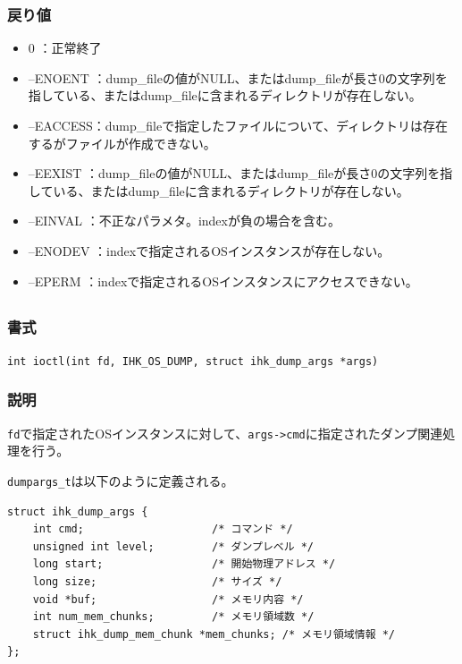 \documentclass[twoside,11pt,fleqn]{book}
\begin{document}
\subsubsection*{戻り値}{\quad}
\begin{itemize}
\item       0 ：正常終了
\item --ENOENT ：dump\_fileの値がNULL、またはdump\_fileが長さ0の文字列を指している、またはdump\_fileに含まれるディレクトリが存在しない。
\item --EACCESS：dump\_fileで指定したファイルについて、ディレクトリは存在するがファイルが作成できない。
\item --EEXIST ：dump\_fileの値がNULL、またはdump\_fileが長さ0の文字列を指している、またはdump\_fileに含まれるディレクトリが存在しない。
\item --EINVAL ：不正なパラメタ。indexが負の場合を含む。
\item --ENODEV ：indexで指定されるOSインスタンスが存在しない。
\item --EPERM  ：indexで指定されるOSインスタンスにアクセスできない。
\end{itemize}
\fi

\subsection{}

\subsubsection*{書式}{\quad} \texttt{int ioctl(int fd, IHK\_OS\_DUMP, struct ihk\_dump\_args *args)}
\subsubsection*{説明}{\quad} 
\texttt{fd}で指定されたOSインスタンスに対して、\texttt{args->cmd}に指定されたダンプ関連処理を行う。


\texttt{dumpargs\_t}は以下のように定義される。
\begin{verbatim}
struct ihk_dump_args {
    int cmd;                    /* コマンド */
    unsigned int level;         /* ダンプレベル */
    long start;                 /* 開始物理アドレス */
    long size;                  /* サイズ */
    void *buf;                  /* メモリ内容 */
    int num_mem_chunks;         /* メモリ領域数 */
    struct ihk_dump_mem_chunk *mem_chunks; /* メモリ領域情報 */
};
\end{verbatim}
\end{document}
